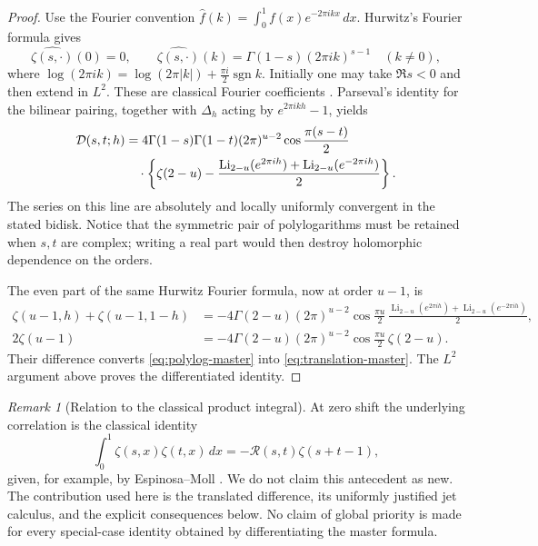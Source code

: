 \documentclass[11pt,a4paper]{article}
\numberwithin{equation}{section}
\theoremstyle{definition}
\theoremstyle{remark}
\newtheorem{remark}[theorem]{Remark}
\DeclareMathOperator{\Li}{Li}
\DeclareMathOperator{\sgn}{sgn}
\begin{document}
\begin{proof}
Use the Fourier convention $\widehat f(k)=\int_0^1 f(x)e^{-2\pi ikx}\,dx$.
Hurwitz's Fourier formula gives
\begin{equation}\label{eq:fourier-hurwitz}
 \widehat{\zeta(s,\cdot)}(0)=0,
 \qquad
 \widehat{\zeta(s,\cdot)}(k)=\Gamma(1-s)(2\pi ik)^{s-1}
 \quad(k\ne0),
\end{equation}
where $\log(2\pi ik)=\log(2\pi|k|)+\tfrac{\pi i}2\sgn k$.
Initially one may take $\Re s<0$ and then extend in $L^2$.
These are classical Fourier coefficients \cite{DLMFHurwitz,EM1}.
Parseval's identity for the bilinear pairing, together with
$\Delta_h$ acting by $e^{2\pi ikh}-1$, yields
\begin{align}
 \mathcal D(s,t;h)
 &=4\Gamma(1-s)\Gamma(1-t)(2\pi)^{u-2}
       \cos\frac{\pi(s-t)}2\notag\\
 &\quad\cdot\left\{\zeta(2-u)
       -\frac{\Li_{2-u}(e^{2\pi ih})+
                    \Li_{2-u}(e^{-2\pi ih})}{2}\right\}.
 \label{eq:polylog-master}
\end{align}
The series on this line are absolutely and locally uniformly convergent
in the stated bidisk. Notice that the symmetric pair of polylogarithms
must be retained when $s,t$ are complex; writing a real part would then
destroy holomorphic dependence on the orders.

The even part of the same Hurwitz Fourier formula, now at order $u-1$,
is
\begin{align*}
 \zeta(u-1,h)+\zeta(u-1,1-h)
 &=-4\Gamma(2-u)(2\pi)^{u-2}\cos\frac{\pi u}{2}\,
      \frac{\Li_{2-u}(e^{2\pi ih})+\Li_{2-u}(e^{-2\pi ih})}{2},\\
 2\zeta(u-1)&=-4\Gamma(2-u)(2\pi)^{u-2}
                   \cos\frac{\pi u}{2}\,\zeta(2-u).
\end{align*}
Their difference converts \eqref{eq:polylog-master} into
\eqref{eq:translation-master}. The $L^2$ argument above proves the
differentiated identity.
\end{proof}

\begin{remark}[Relation to the classical product integral]
At zero shift the underlying correlation is the classical identity
\[
 \int_0^1\zeta(s,x)\zeta(t,x)\,dx
 =-\mathcal R(s,t)\zeta(s+t-1),
\]
given, for example, by Espinosa--Moll \cite[Theorem 3.1]{EM1}.
We do not claim this antecedent as new. The contribution used here is
the translated difference, its uniformly justified jet calculus, and the
explicit consequences below. No claim of global priority is made for
every special-case identity obtained by differentiating the master formula.
\end{remark}
\end{document}
